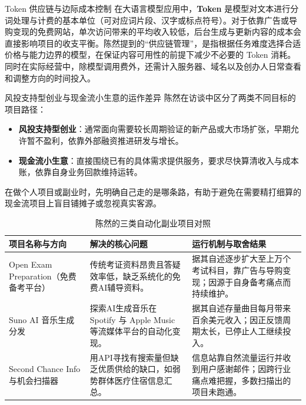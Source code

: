 \documentclass[UTF8,a4paper,11pt,fontset=fandol]{ctexart}
\begin{document}
\begin{knowledgebox}{Token 供应链与边际成本控制}
在大语言模型应用中，\textbf{Token} 是模型对文本进行分词处理与计费的基本单位（可对应词片段、汉字或标点符号）。对于依靠广告或导购变现的免费网站，单次访问带来的平均收入较低，后台生成与更新内容的成本会直接影响项目的收支平衡。陈然提到的“供应链管理”，是指根据任务难度选择合适价格与能力边界的模型，在保证内容可用性的前提下减少不必要的 Token 消耗。同时在实际经营中，除模型调用费外，还需计入服务器、域名以及创办人日常查看和调整方向的时间投入。
\end{knowledgebox}
\begin{importantbox}{风投支持型创业与现金流小生意的运作差异}
陈然在访谈中区分了两类不同目标的项目路径：
\begin{itemize}
\item \textbf{风投支持型创业}：通常面向需要较长周期验证的新产品或大市场扩张，早期允许暂不盈利，依靠外部融资推进研发与增长。
\item \textbf{现金流小生意}：直接围绕已有的具体需求提供服务，要求尽快算清收入与成本账，依靠自身业务回款维持运转。
\end{itemize}
在做个人项目或副业时，先明确自己走的是哪条路，有助于避免在需要精打细算的现金流项目上盲目铺摊子或忽视真实客源。
\end{importantbox}
\begin{table}[H]\centering\small
\caption{陈然的三类自动化副业项目对照}
\begin{tabular}{>{\raggedright\arraybackslash}p{\dimexpr(\linewidth-6\tabcolsep)/3\relax}>{\raggedright\arraybackslash}p{\dimexpr(\linewidth-6\tabcolsep)/3\relax}>{\raggedright\arraybackslash}p{\dimexpr(\linewidth-6\tabcolsep)/3\relax}}
\toprule
项目名称与方向 & 解决的核心问题 & 运行机制与取舍结果\\\midrule
Open Exam Preparation（免费备考平台） & 传统考证资料昂贵且答疑效率低，缺乏系统化的免费AI辅导资料。 & 据其自述逐步扩大至上万个考试科目，靠广告与导购变现；因源于自身备考痛点而持续维护。\\[4pt]
Suno AI 音乐生成分发 & 探索AI生成音乐在 Spotify 与 Apple Music 等流媒体平台的自动化变现。 & 据其自述存量曲目每月带来百余美元收入；因正反馈周期太长，已停止人工继续投入。\\[4pt]
Second Chance Info 与机会扫描器 & 用API寻找有搜索量但缺乏优质供给的缺口，如弱势群体医疗住宿信息汇总。 & 信息站靠自然流量运行并收到用户感谢邮件；因跨行业痛点难把握，多数扫描出的项目未跑通。\\[4pt]
\bottomrule\end{tabular}\end{table}
\end{document}
